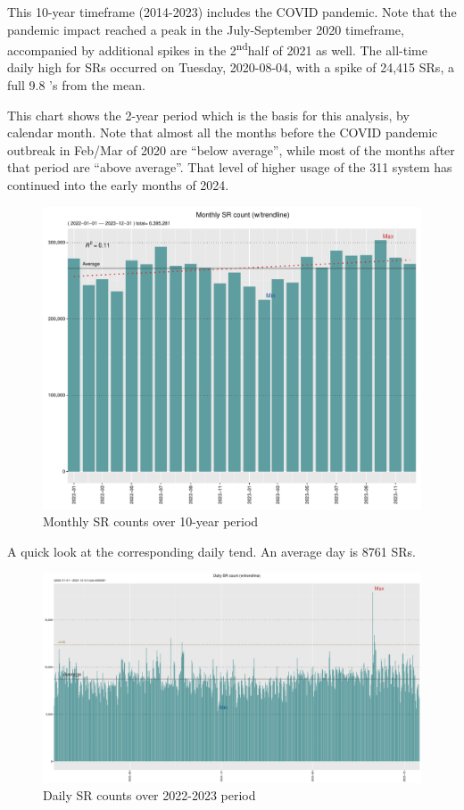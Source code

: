 \documentclass[12pt, titlepage]{article}
\begin{document}
This 10-year timeframe (2014-2023) includes the COVID pandemic. Note that the pandemic
impact reached a peak in the July-September 2020 timeframe, accompanied by additional spikes
in the 2\textsuperscript{nd}half of 2021 as well. The all-time daily high for SRs occurred on Tuesday, 2020-08-04, 
with a spike of 24,415 SRs, a full 9.8 \textsigma's from the mean. 

This chart shows the 2-year period which is the basis for this analysis, by calendar month. 
Note that almost all the months before the COVID pandemic outbreak in Feb/Mar
of 2020 are ``below average'', while most of the months after that period are ``above average''. That level of higher usage
of the 311 system has continued into the early months of 2024.

\begin{figure}[htbp]
  \centering
  \includegraphics[width=\textwidth]{Monthly.pdf}
  \caption{Monthly SR counts over 10-year period}
  \label{fig:monthly-counts}
\end{figure}

A quick look at the corresponding  daily tend.  An average day is 8761 SRs. 

\begin{figure}[H]
  \centering
  \includegraphics[width=\textwidth]{Daily.pdf}
  \caption{Daily SR counts over 2022-2023 period}
  \label{fig:daily-counts}
\end{figure}
\end{document}
